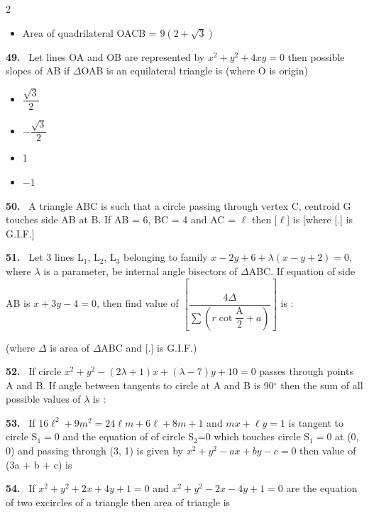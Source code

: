 \documentclass[10pt]{extarticle}
\newcommand{\qn}[1]{\par\smallskip\noindent\textbf{#1.}~}
\newenvironment{qoptions}{\begin{itemize}[leftmargin=1.8em,itemsep=1pt,topsep=2pt,label={}]}{\end{itemize}}
\newcommand{\opt}[2]{\item[(#1)] #2}
\begin{document}
\begin{multicols}{2}
\begin{qoptions}
\opt{D}{Area of quadrilateral OACB = $9(2+\sqrt3)$}
\end{qoptions}
\qn{49} Let lines OA and OB are represented by $x^2+y^2+4xy=0$ then possible slopes of AB if $\Delta$OAB is an equilateral triangle is (where O is origin)
\begin{qoptions}
\opt{A}{$\dfrac{\sqrt3}2$}
\opt{B}{$-\dfrac{\sqrt3}2$}
\opt{C}{1}
\opt{D}{$-1$}
\end{qoptions}
\qn{50} A triangle ABC is such that a circle passing through vertex C, centroid G touches side AB at B. If AB = 6, BC = 4 and AC = $\ell$ then [$\ell$] is [where [.] is G.I.F.]
\qn{51} Let 3 lines L$_1$, L$_2$, L$_3$ belonging to family $x-2y+6+\lambda(x-y+2)=0$, where $\lambda$ is a parameter, be internal angle bisectors of $\Delta$ABC. If equation of side AB is $x+3y-4=0$, then find value of $\left[\dfrac{4\Delta}{\sum\left(r\cot\dfrac{\mathrm A}2+a\right)}\right]$ is :\par
(where $\Delta$ is area of $\Delta$ABC and [.] is G.I.F.)
\qn{52} If circle $x^2+y^2-(2\lambda+1)x+(\lambda-7)y+10=0$ passes through points A and B. If angle between tangents to circle at A and B is 90$^\circ$ then the sum of all possible values of $\lambda$ is :
\qn{53} If $16\ell^2+9m^2=24\ell m+6\ell+8m+1$ and $mx+\ell y=1$ is tangent to circle S$_1=0$ and the equation of of circle S$_2$=0 which touches circle S$_1=0$ at (0, 0) and passing through (3, 1) is given by $x^2+y^2-ax+by-c=0$ then value of (3a + b + c) is
\qn{54} If $x^2+y^2+2x+4y+1=0$ and $x^2+y^2-2x-4y+1=0$ are the equation of two excircles of a triangle then area of triangle is
\end{multicols}
\end{document}
